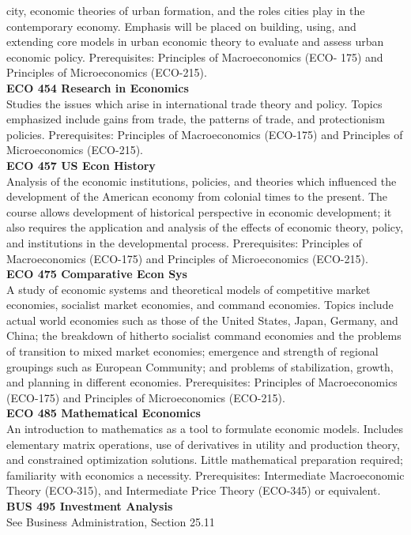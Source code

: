 \documentclass[
  letterpaper,
]{scrbook}
\begin{document}
city, economic theories of urban formation, and the roles cities play in
the contemporary economy. Emphasis will be placed on building, using,
and extending core models in urban economic theory to evaluate and
assess urban economic policy. Prerequisites: Principles of
Macroeconomics (ECO- 175) and Principles of Microeconomics (ECO-215).\\
\textbf{ECO 454 Research in Economics}\\
Studies the issues which arise in international trade theory and policy.
Topics emphasized include gains from trade, the patterns of trade, and
protectionism policies. Prerequisites: Principles of Macroeconomics
(ECO-175) and Principles of Microeconomics (ECO-215).\\
\textbf{ECO 457 US Econ History}\\
Analysis of the economic institutions, policies, and theories which
influenced the development of the American economy from colonial times
to the present. The course allows development of historical perspective
in economic development; it also requires the application and analysis
of the effects of economic theory, policy, and institutions in the
developmental process. Prerequisites: Principles of Macroeconomics
(ECO-175) and Principles of Microeconomics (ECO-215).\\
\textbf{ECO 475 Comparative Econ Sys}\\
A study of economic systems and theoretical models of competitive market
economies, socialist market economies, and command economies. Topics
include actual world economies such as those of the United States,
Japan, Germany, and China; the breakdown of hitherto socialist command
economies and the problems of transition to mixed market economies;
emergence and strength of regional groupings such as European Community;
and problems of stabilization, growth, and planning in different
economies. Prerequisites: Principles of Macroeconomics (ECO-175) and
Principles of Microeconomics (ECO-215).\\
\textbf{ECO 485 Mathematical Economics}\\
An introduction to mathematics as a tool to formulate economic models.
Includes elementary matrix operations, use of derivatives in utility and
production theory, and constrained optimization solutions. Little
mathematical preparation required; familiarity with economics a
necessity. Prerequisites: Intermediate Macroeconomic Theory (ECO-315),
and Intermediate Price Theory (ECO-345) or equivalent.\\
\textbf{BUS 495 Investment Analysis}\\
See Business Administration, Section 25.11
\end{document}
